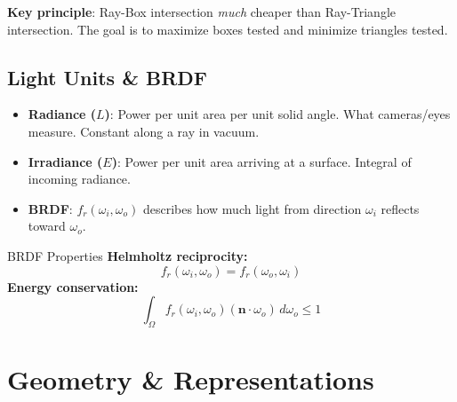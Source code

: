 \documentclass[11pt]{article}
\begin{document}
\item \textbf{Key principle}: Ray-Box intersection \textit{much} cheaper than Ray-Triangle intersection. The goal is to maximize boxes tested and minimize triangles tested.

\subsection{Light Units \& BRDF}
\begin{itemize}
    \item \textbf{Radiance ($L$)}: Power per unit area per unit solid angle. What cameras/eyes measure. Constant along a ray in vacuum.
    \item \textbf{Irradiance ($E$)}: Power per unit area arriving at a surface. Integral of incoming radiance.
    \item \textbf{BRDF}: $f_r(\omega_i, \omega_o)$ describes how much light from direction $\omega_i$ reflects toward $\omega_o$.
\end{itemize}

\begin{formulabox}{BRDF Properties}
\textbf{Helmholtz reciprocity:}
$$f_r(\omega_i, \omega_o) = f_r(\omega_o, \omega_i)$$
\textbf{Energy conservation:}
$$\int_{\Omega} f_r(\omega_i, \omega_o)(\mathbf{n} \cdot \omega_o)\, d\omega_o \leq 1$$
\end{formulabox}

\section{Geometry \& Representations}
\end{document}
